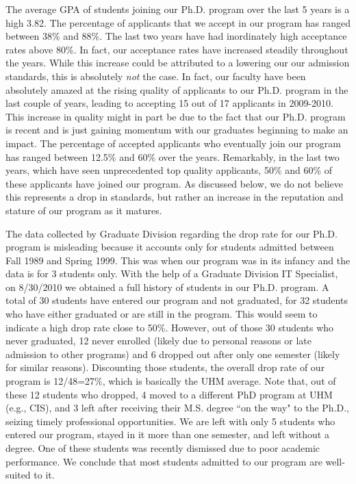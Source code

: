 \documentclass[12pt]{article}
\begin{document}
The average GPA of students joining our Ph.D. program over the last 5 years
is a high 3.82. The percentage of applicants that we accept in our program
has ranged between 38\% and 88\%. The last two years have had inordinately
high acceptance rates above 80\%. In fact, our acceptance rates have
increased steadily throughout the years. While this increase could be
attributed to a lowering our our admission standards, this is absolutely
\emph{not} the case. In fact, our faculty have been absolutely amazed at
the rising quality of applicants to our Ph.D. program in the last couple of
years, leading to accepting 15 out of 17 applicants in 2009-2010. This
increase in quality might in part be due to the fact that our Ph.D. program
is recent and is just gaining momentum with our graduates beginning to make
an impact.  The percentage of accepted applicants who eventually join our
program has ranged between 12.5\% and 60\% over the years. Remarkably, in
the last two years, which have seen unprecedented top quality applicants,
50\% and 60\% of these applicants have joined our program. As discussed
below, we do not believe this represents a drop in standards, but rather an increase
in the reputation and stature of our program as it matures.

The data collected by Graduate Division regarding the drop rate for
our Ph.D. program is misleading because it
accounts only for students admitted between Fall 1989 and Spring 1999.
This was when our program was in its infancy and the data is 
for 3 students only.  With the help of a Graduate Division IT
Specialist, on 8/30/2010 we obtained a full history of students in our
Ph.D. program. A total of 30 students have entered our program and not
graduated, for 32 students who have either graduated or are still in
the program. This would seem to indicate a high drop rate close to
50\%. However, out of those 30 students who never graduated, 12 never
enrolled (likely due to personal reasons or late admission to other
programs) and 6 dropped out after only one semester (likely for
similar reasons). Discounting those students, the overall drop rate of
our program is 12/48=27\%, which is basically the UHM average.  Note
that, out of these 12 students who dropped, 4 moved to a different PhD
program at UHM (e.g., CIS), and 3 left after receiving their M.S.
degree ``on the way" to the Ph.D., seizing timely
professional opportunities.  We are left with only 5 students who
entered our program, stayed in it more than one semester, and left
without a degree. One of these students was recently dismissed due to
poor academic performance.  We conclude that most students admitted to
our program are well-suited to it.
\end{document}
